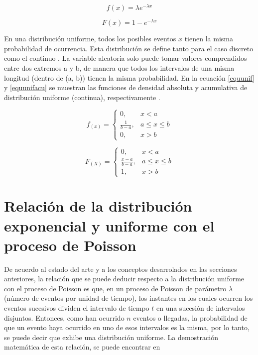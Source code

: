 \documentclass{article}
\begin{document}
\begin{equation} \label{equexpo} 
f(x) = \lambda e^{-\lambda x} 
\end{equation}

\begin{equation} \label{equexpoacu} 
F(x) = 1-e^{-\lambda x}
\end{equation}

En una distribución uniforme, todos los posibles eventos $x$ tienen la misma probabilidad de ocurrencia. Esta distribución se define tanto para el caso discreto como el continuo \cite{notasElisa}. La variable aleatoria solo puede tomar valores comprendidos entre dos extremos a y b, de manera que todos los intervalos de una misma longitud (dentro de (a, b)) tienen la misma probabilidad. En la ecuación \ref{equunif} y \ref{equunifacu} se muestran las funciones de densidad absoluta y acumulativa de distribución uniforme (continua), respectivamente \cite{notasElisa, walpole}.

\begin{equation} \label{equunif}
f_{(x)} = 
\begin{cases}
0, & x < a \\
\frac{1}{b-a}, & a \leq x \leq b \\ 
0, & x > b 
\end{cases} 
\end{equation}


\begin{equation} \label{equunifacu}
F_{(X)} = 
\begin{cases}
0, & x < a \\
\frac{x-a}{b-a}, & a \leq x \leq b \\ 
1, & x > b 
\end{cases} 
\end{equation}

\section{Relación de la distribución exponencial y uniforme con el proceso de Poisson}

De acuerdo al estado del arte y a los conceptos desarrolados en las secciones anteriores, la relación que se puede deducir respecto a la distribución uniforme con el proceso de Poisson es que, en un proceso de Poisson de parámetro $\lambda$ (número de eventos por unidad de tiempo), los instantes en los cuales ocurren los eventos sucesivos dividen el intervalo de tiempo $t$ en una sucesión de intervalos disjuntos. Entonces, como han ocurrido $n$ eventos o llegadas, la probabilidad de que un evento haya ocurrido en uno de esos intervalos es la misma, por lo tanto, se puede decir que exhibe una distribución uniforme. La demostración matemática de esta relación, se puede encontrar en \cite{taylor, walpole, notasclase}
\end{document}
